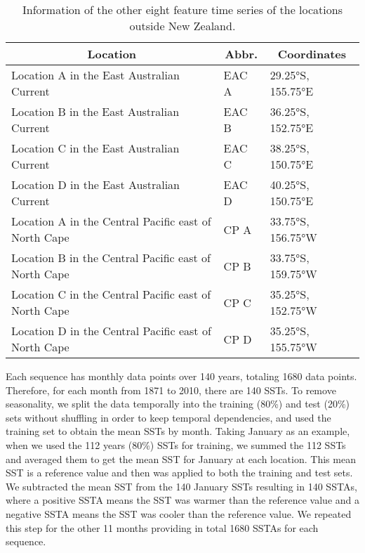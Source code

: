 \documentclass[11pt, a4paper]{article}
\begin{document}
\begin{table}[H]
\centering
\footnotesize
\caption{Information of the other eight feature time series of the locations outside New Zealand.}\label{tb:otherfeat}
\begin{tabular}{lll}
\multicolumn{1}{c}{\textbf{Location}}                & \multicolumn{1}{c}{\textbf{Abbr.}} & \multicolumn{1}{c}{\textbf{Coordinates}} \\ \hline
Location A in the East Australian Current            & EAC A                              & 29.25°S, 155.75°E                        \\
Location B in the East Australian Current            & EAC B                              & 36.25°S, 152.75°E                        \\
Location C in the East Australian Current            & EAC C                              & 38.25°S, 150.75°E                        \\
Location D in the East Australian Current            & EAC D                              & 40.25°S, 150.75°E                        \\
Location A in the Central Pacific east of North Cape & CP A                               & 33.75°S, 156.75°W                        \\
Location B in the Central Pacific east of North Cape & CP B                               & 33.75°S, 159.75°W                        \\
Location C in the Central Pacific east of North Cape & CP C                               & 35.25°S, 152.75°W                        \\
Location D in the Central Pacific east of North Cape & CP D                               & 35.25°S, 155.75°W
\end{tabular}
\end{table}

Each sequence has monthly data points over 140 years, totaling 1680 data points. Therefore, for each month from 1871 to 2010, there are 140 SSTs. To remove seasonality, we split the data temporally into the training (80\%) and test (20\%) sets without shuffling in order to keep temporal dependencies, and used the training set to obtain the mean SSTs by month. Taking January as an example, when we used the 112 years (80\%) SSTs for training, we summed the 112 SSTs and averaged them to get the mean SST for January at each location. This mean SST is a reference value and then was applied to both the training and test sets. We subtracted the mean SST from the 140 January SSTs resulting in 140 SSTAs, where a positive SSTA means the SST was warmer than the reference value and a negative SSTA means the SST was cooler than the reference value. We repeated this step for the other 11 months providing in total 1680 SSTAs for each sequence.
\end{document}
